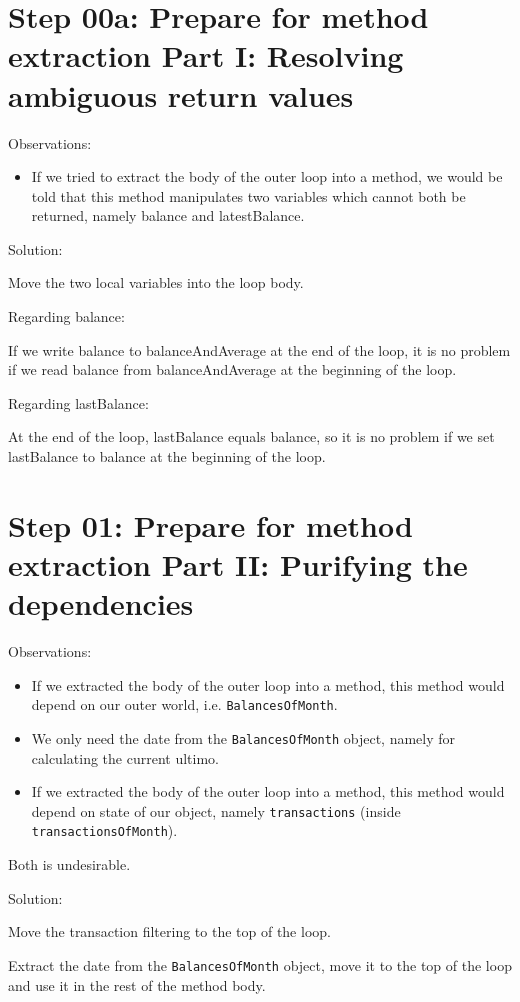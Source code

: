 \documentclass[a4paper,fleqn,titlepage,11pt]{article}
\begin{document}
\section*{Step 00a: Prepare for method extraction Part I: Resolving ambiguous return values}

Observations:
\begin{itemize}
\item If we tried to extract the body of the outer loop into a method, we would be told that this method manipulates two variables which cannot both be returned, namely balance and latestBalance.
\end{itemize}

Solution:

Move the two local variables into the loop body.

Regarding balance:

If we write balance to balanceAndAverage at the end of the loop, it is no problem if we read balance from balanceAndAverage at the beginning of the loop.

Regarding lastBalance:

At the end of the loop, lastBalance equals balance, so it is no problem if we set lastBalance to balance at the beginning of the loop.

\section*{Step 01: Prepare for method extraction Part II: Purifying the dependencies}

Observations:
\begin{itemize}
\item If we extracted the body of the outer loop into a method, this method would depend on our outer world, i.e. \texttt{BalancesOfMonth}.
\item We only need the date from the \texttt{BalancesOfMonth} object, namely for calculating the current ultimo.
\item If we extracted the body of the outer loop into a method, this method would depend on state of our object, namely \texttt{transactions} (inside \texttt{transactionsOfMonth}).
\end{itemize}

Both is undesirable.

Solution:

Move the transaction filtering to the top of the loop.

Extract the date from the \texttt{BalancesOfMonth} object, move it to the top of the loop and use it in the rest of the method body.
\end{document}

